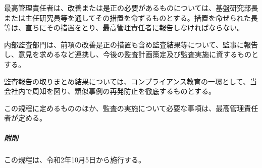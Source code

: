 \documentclass[10pt,a4paper,uplatex]{jsarticle}
\begin{document}
最高管理責任者は、改善または是正の必要があるものについては、基盤研究部長または主任研究員等を通してその措置を命ずるものとする。措置を命ぜられた長等は、直ちにその措置をとり、最高管理責任者に報告しなければならない。

内部監査部門は、前項の改善是正の措置も含め監査結果等について、監事に報告し、意見を求めるなど連携し、今後の監査計画策定及び監査実施に資するものとする。

監査報告の取りまとめ結果については、コンプライアンス教育の一環として、当会社内で周知を図り、類似事例の再発防止を徹底するものとする。

この規程に定めるもののほか、監査の実施について必要な事項は、最高管理責任者が定める。

\vspace{1cm}
\subparagraph{附則}
この規程は、令和2年10月5日から施行する。
\end{document}
